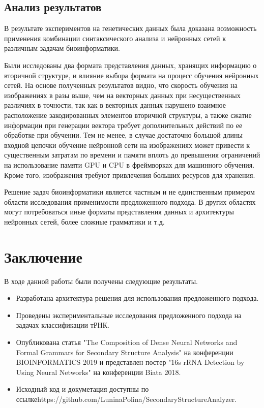 \documentclass[14pt]{matmex-diploma-custom}
\begin{document}


\subsection{Анализ результатов}
В результате экспериментов на генетических данных была доказана возможность применения комбинации синтаксического анализа и нейронных сетей к различным задачам биоинформатики.

Были исследованы два формата представления данных, хранящих информацию о вторичной структуре, и влияние выбора формата на процесс обучения нейронных сетей. На основе полученных результатов видно, что скорость обучения на изображениях в разы выше, чем на векторных данных при несущественных различиях в точности, так как в векторных данных нарушено взаимное расположение закодированных элементов вторичной структуры, а также сжатие информации при генерации вектора требует дополнительных действий по ее обработке при обучении. Тем не менее, в случае достаточно большой длины входной цепочки обучение нейронной сети на изображениях может привести к существенным затратам по времени и памяти вплоть до превышения ограничений на использование памяти GPU и CPU в фреймворках для машинного обучения. Кроме того, изображения требуют привлечения больших ресурсов для хранения.

Решение задач биоинформатики является частным и не единственным примером области исследования применимости предложенного подхода. В других областях могут потребоваться иные форматы представления данных и архитектуры нейронных сетей, более сложные грамматики и т.д.


\section*{Заключение}
В ходе данной работы были получены следующие результаты.
\begin{itemize}
    \item Разработана архитектура решения для использования предложенного подхода.
    \item Проведены экспериментальные исследования предложенного подхода на задачах классификации тРНК. 
    \item Опубликована статья "The Composition of Dense Neural Networks and Formal Grammars for Secondary Structure Analysis" на конференции BIOINFORMATICS 2019 и представлен постер "16s rRNA Detection by Using Neural Networks" на конференции Biata 2018.
    \item Исходный код и докуметация доступны по ссылке\linebreak https://github.com/LuninaPolina/SecondaryStructureAnalyzer.
\end{itemize}
\end{document}
